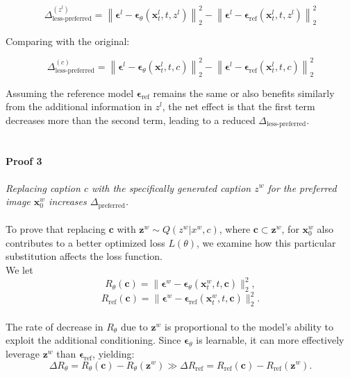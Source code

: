 $$
\Delta_{\text{less-preferred}}^{(z^l)} = \left\| \boldsymbol{\epsilon}^l - \boldsymbol{\epsilon}_\theta(\mathbf{x}_t^l, t, z^l) \right\|_2^2 - \left\| \boldsymbol{\epsilon}^l - \boldsymbol{\epsilon}_{\text{ref}}(\mathbf{x}_t^l, t, z^l) \right\|_2^2
$$

Comparing with the original:

$$
\Delta_{\text{less-preferred}}^{(c)} = \left\| \boldsymbol{\epsilon}^l - \boldsymbol{\epsilon}_\theta(\mathbf{x}_t^l, t, c) \right\|_2^2 - \left\| \boldsymbol{\epsilon}^l - \boldsymbol{\epsilon}_{\text{ref}}(\mathbf{x}_t^l, t, c) \right\|_2^2
$$

Assuming the reference model $ \boldsymbol{\epsilon}_{\text{ref}} $ remains the same or also benefits similarly from the additional information in $ z^l $, the net effect is that the first term decreases more than the second term, leading to a reduced $ \Delta_{\text{less-preferred}} $.
\\
\\
\paragraph{Proof 3} \textit{Replacing caption $ c $ with the specifically generated caption $ z^w $ for the preferred image $ \mathbf{x}_0^w $ increases $\Delta_{\text{preferred}}$.}
\\
\\
To prove that replacing $ \mathbf{c} $ with $ \mathbf{z}^w  \sim Q(z^w|x^w, c) $, where $ \mathbf{c} \subset \mathbf{z}^w $, for $ \mathbf{x}_0^w $ also contributes to a better optimized loss $L(\theta)$, we examine how this particular substitution affects the loss function.
\\
We let
$$
R_\theta(\mathbf{c}) = \| \boldsymbol{\epsilon}^w - \boldsymbol{\epsilon}_\theta(\mathbf{x}_t^w, t, \mathbf{c}) \|_2^2,
$$
$$
R_{\text{ref}}(\mathbf{c}) = \| \boldsymbol{\epsilon}^w - \boldsymbol{\epsilon}_{\text{ref}}(\mathbf{x}_t^w, t, \mathbf{c}) \|_2^2.
$$
\\
The rate of decrease in $ R_\theta $ due to $ \mathbf{z}^w $ is proportional to the model's ability to exploit the additional conditioning. Since $ \boldsymbol{\epsilon}_\theta $ is learnable, it can more effectively leverage $ \mathbf{z}^w $ than $ \boldsymbol{\epsilon}_{\text{ref}} $, yielding:
$$
\Delta R_\theta = R_\theta(\mathbf{c}) - R_\theta(\mathbf{z}^w) \gg \Delta R_{\text{ref}} = R_{\text{ref}}(\mathbf{c}) - R_{\text{ref}}(\mathbf{z}^w).
$$

